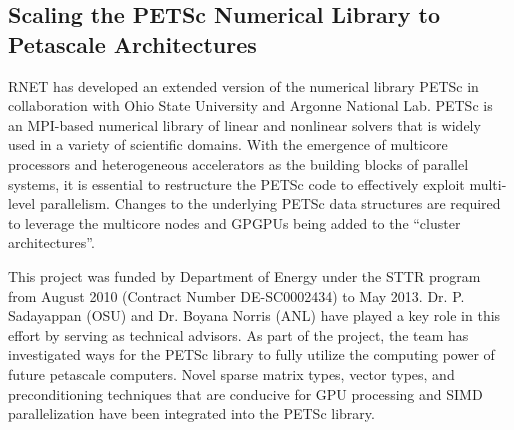 \subsection{Scaling the PETSc Numerical Library to Petascale Architectures}

RNET has developed an extended version of the numerical library PETSc \cite{Lowell1} in
collaboration with Ohio State University and Argonne National Lab. PETSc is an MPI-based numerical library of
linear and nonlinear solvers that is widely used in a variety of scientific domains. With the
emergence of multicore processors and heterogeneous accelerators as the building blocks of
parallel systems, it is essential to restructure the PETSc code to effectively exploit multi-level
parallelism. Changes to the underlying PETSc data structures are required to leverage the multicore
nodes and GPGPUs being added to the ``cluster architectures''.

This project was funded by Department of Energy under the STTR program from August 2010 (Contract Number DE-SC0002434) 
to May 2013. Dr. P. Sadayappan (OSU) and Dr. Boyana Norris (ANL) have played a key role in this effort by serving as 
technical advisors. As part of the project, the team has investigated ways for the PETSc library to fully utilize the 
computing power of future petascale computers. Novel sparse matrix types,  vector types, and preconditioning techniques 
that are conducive for GPU processing and SIMD parallelization have been integrated into the PETSc library. 






